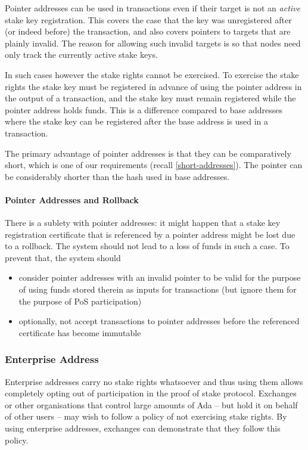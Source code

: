 \documentclass[11pt,a4paper]{article}
\begin{document}
Pointer addresses can be used in transactions even if their target is
not an \emph{active} stake key registration. This covers the case that
the key was unregistered after (or indeed before) the transaction, and
also covers pointers to targets that are plainly invalid. The reason for
allowing such invalid targets is so that nodes need only track the
currently active stake keys.

In such cases however the stake rights cannot be exercised. To exercise
the stake rights the stake key must be registered in advance of using
the pointer address in the output of a transaction, and the stake key
must remain registered while the pointer address holds funds. This is a
difference compared to base addresses where the stake key can be
registered after the base address is used in a transaction.

The primary advantage of pointer addresses is that they can be
comparatively short, which is one of our requirements (recall
\cref{short-addresses}). The pointer can be considerably shorter than
the hash used in base addresses.

\paragraph{Pointer Addresses and Rollback}
There is a sublety with pointer addresses: it might happen that a
stake key registration certificate that is referenced by a pointer
address might be lost due to a rollback. The system should not lead to
a loss of funds in such a case. To prevent that, the system should
\begin{itemize}
\item consider pointer addresses with an invalid pointer to be valid
  for the purpose of using funds stored therein as inputs for
  transactions (but ignore them for the purpose of PoS participation)
\item optionally, not accept transactions to pointer addresses before
  the referenced certificate has become immutable
\end{itemize}

\subsubsection{Enterprise Address}
\label{enterprise-address}

Enterprise addresses carry no stake rights whatsoever and thus using
them allows completely opting out of participation in the proof of stake
protocol. Exchanges or other organisations that control large amounts of
Ada -- but hold it on behalf of other users -- may wish to follow a
policy of not exercising stake rights. By using enterprise addresses,
exchanges can demonstrate that they follow this policy.
\end{document}
